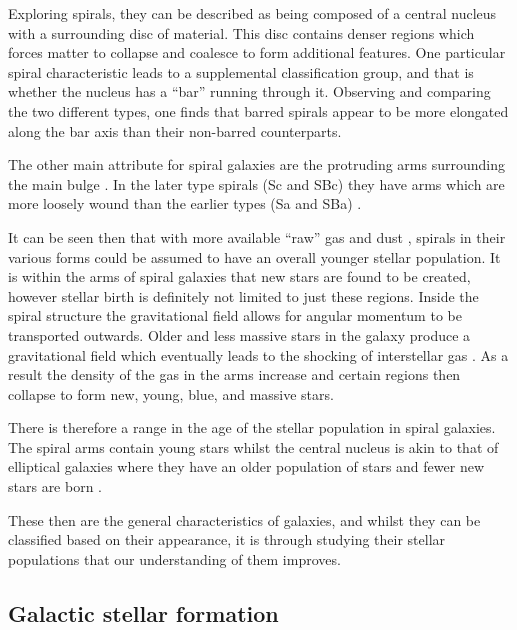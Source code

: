 \documentclass[12pt, twocolumn]{revtex4-1}    %
\begin{document}
Exploring spirals, they can be described as being composed of a central nucleus with a surrounding disc of material. This disc contains denser regions which forces matter to collapse and coalesce to form additional features. One particular spiral characteristic leads to a supplemental classification group, and that is whether the nucleus has a ``bar'' running through it. Observing and comparing the two different types, one finds that barred spirals appear to be more elongated along the bar axis than their non-barred counterparts. 

The other main attribute for spiral galaxies are the protruding arms surrounding the main bulge \citep{carroll_astro}. In the later type spirals (Sc and SBc) they have arms which are more loosely wound than the earlier types (Sa and SBa) \citep{moore_databook}.

It can be seen then that with more available ``raw'' gas and dust \citep{carroll_astro}, spirals in their various forms could be assumed to have an overall younger stellar population. It is within the arms of spiral galaxies that new stars are found to be created, however stellar birth is definitely not limited to just these regions. Inside the spiral structure the gravitational field allows for angular momentum to be transported outwards. Older and less massive stars in the galaxy produce a gravitational field which eventually leads to the shocking of interstellar gas \citep{binney_galaxies}. As a result the density of the gas in the arms increase and certain regions then collapse to form new, young, blue, and massive stars. 

There is therefore a range in the age of the stellar population in spiral galaxies. The spiral arms contain young stars whilst the central nucleus is akin to that of elliptical galaxies where they have an older population of stars and fewer new stars are born \citep{carroll_astro, binney_galaxies}.

These then are the general characteristics of galaxies, and whilst they can be classified based on their appearance, it is through studying their stellar populations that our understanding of them improves. 


\subsection*{Galactic stellar formation}
\end{document}
